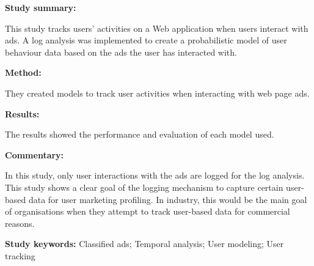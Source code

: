 \begin{tcolorbox}[colback=gray!5!white, colframe=pastelgreen!40!black, title=Tracking User Activities and Marketplace Dynamics in Classified Ads\cite{Waqar2017}]
	\begin{minipage}[t]{0.25\textwidth}
		\textbf{Study summary:}
	\end{minipage}
	\hfill
	\begin{minipage}[t]{0.65\textwidth}
		This study tracks users' activities on a Web application when users interact with ads. A log
		analysis was implemented to create a probabilistic model of user behaviour data based on the
		ads the user has interacted with.
	\end{minipage}

	\vspace{0.75em} 

	\begin{minipage}[t]{0.25\textwidth}
		\textbf{Method:}
	\end{minipage}
	\hfill
	\begin{minipage}[t]{0.65\textwidth}
		They created models to track user activities when interacting with web page ads.
	\end{minipage}

	\vspace{0.75em} 

	\begin{minipage}[t]{0.25\textwidth}
		\textbf{Results:}
	\end{minipage}
	\hfill
	\begin{minipage}[t]{0.65\textwidth}
		The results showed the performance and evaluation of each model used.
	\end{minipage}

	\vspace{0.75em} 

	\begin{minipage}[t]{0.25\textwidth}
		\textbf{Commentary:}
	\end{minipage}
	\hfill
	\begin{minipage}[t]{0.65\textwidth}
		In this study, only user interactions with the ads are logged for the log analysis. This
		study shows a clear goal of the logging mechanism to capture certain user-based data for
		user marketing profiling. In industry, this would be the main goal of organisations when
		they attempt to track user-based data for commercial reasons.
	\end{minipage}
	\tcblower
	\textbf{Study keywords:} Classified ads; Temporal analysis; User modeling; User tracking
\end{tcolorbox}

